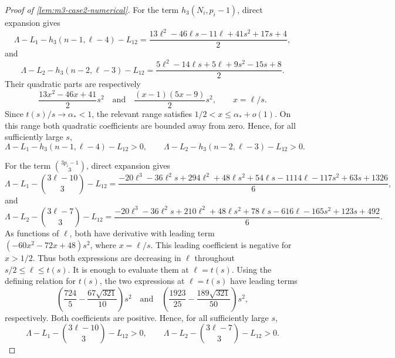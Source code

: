 \documentclass[10pt,a4paper]{article}
\numberwithin{equation}{section}
\theoremstyle{definition}
\begin{document}
\begin{proof}[Proof of \cref{lem:m3-case2-numerical}]
    For the term \(h_3(N_i,p_i-1)\), direct expansion gives
    \[
        \Lambda-L_1-h_3(n-1,\ell-4)-L_{12}
        =
        \frac{
            13\ell^2-46\ell s-11\ell+41s^2+17s+4
        }2,
    \]
    and
    \[
        \Lambda-L_2-h_3(n-2,\ell-3)-L_{12}
        =
        \frac{
            5\ell^2-14\ell s+5\ell+9s^2-15s+8
        }2.
    \]
    Their quadratic parts are respectively
    \[
        \frac{13x^2-46x+41}{2}s^2
        \quad\text{and}\quad
        \frac{(x-1)(5x-9)}2s^2,
        \qquad x=\ell/s.
    \]
    Since \(t(s)/s\to\alpha_*<1\), the relevant range satisfies
    \(1/2<x\le\alpha_*+o(1)\).  On this range both quadratic coefficients
    are bounded away from zero.  Hence, for all sufficiently large \(s\),
    \[
        \Lambda-L_1-h_3(n-1,\ell-4)-L_{12}>0,
        \qquad
        \Lambda-L_2-h_3(n-2,\ell-3)-L_{12}>0.
    \]

    For the term \(\binom{3p_i-1}{3}\), direct expansion gives
    \[
        \Lambda-L_1-\binom{3\ell-10}{3}-L_{12}
        =
        \frac{
            -20\ell^3-36\ell^2s+294\ell^2+48\ell s^2
            +54\ell s-1114\ell-117s^2+63s+1326
        }6,
    \]
    and
    \[
        \Lambda-L_2-\binom{3\ell-7}{3}-L_{12}
        =
        \frac{
            -20\ell^3-36\ell^2s+210\ell^2+48\ell s^2
            +78\ell s-616\ell-165s^2+123s+492
        }6.
    \]
    As functions of \(\ell\), both have derivative with leading term
    \((-60x^2-72x+48)s^2\), where \(x=\ell/s\).  This leading coefficient is
    negative for \(x>1/2\).  Thus both expressions are decreasing in \(\ell\)
    throughout \(s/2\le\ell\le t(s)\).  It is enough to evaluate them at
    \(\ell=t(s)\).  Using the defining relation for \(t(s)\), the two
    expressions at \(\ell=t(s)\) have leading terms
    \[
        \left(\frac{724}{5}-\frac{67\sqrt{321}}{10}\right)s^2
        \quad\text{and}\quad
        \left(\frac{1923}{25}-\frac{189\sqrt{321}}{50}\right)s^2,
    \]
    respectively.  Both coefficients are positive.  Hence, for all
    sufficiently large \(s\),
    \[
        \Lambda-L_1-\binom{3\ell-10}{3}-L_{12}>0,
        \qquad
        \Lambda-L_2-\binom{3\ell-7}{3}-L_{12}>0.
    \]
\end{proof}
\end{document}
